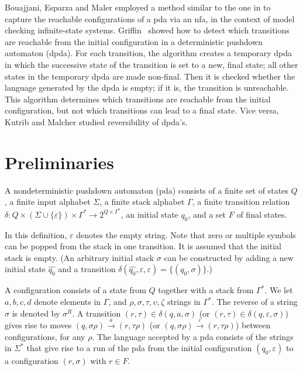 \documentclass{llncs}
\newcommand{\eps}{\ensuremath{\varepsilon}}
\begin{document}
Bouajjani, Esparza and Maler \cite{BouajjaniEM97} employed a method similar to the one in \cite{FinkelWW97}
to capture the reachable configurations of a pda via an nfa, in the context of model checking infinite-state systems.
Griffin~\cite{Griffin06} showed how to detect which transitions are reachable
from the initial configuration in a deterministic pushdown automaton (dpda).
For each transition, the algorithm creates a temporary dpda in which the
successive state of the transition is set to a new, final state; all other
states in the temporary dpda are made non-final. Then it is checked whether the
language generated by the dpda is empty; if it is, the transition is unreachable.
This algorithm determines which transitions are reachable
from the initial configuration, but not which transitions can lead to a final state.
Vice versa, Kutrib and Malcher \cite{KutribMalcher12} studied reversibility of dpda's.




\section{Preliminaries}

\begin{definition}\label{def:NPDA}
A nondeterministic pushdown automaton (pda) consists of
a finite set of states $Q$, a finite input alphabet $\Sigma$, a finite stack alphabet $\Gamma$,
a finite transition relation $\delta:Q \times (\Sigma\cup\{\eps\}) \times \Gamma^* \rightarrow 2^{Q \times \Gamma^*}$,
an initial state $q_0$, and a set $F$ of final states.
\end{definition}

\noindent
In this definition, $\eps$ denotes the empty string. Note that
zero or multiple symbols can be popped from the stack in one transition.
It is assumed that the initial stack is empty. (An arbitrary initial stack $\sigma$ can be constructed
by adding a new initial state $\hat{q_0}$ and a transition $\delta(\hat{q_0},\eps,\eps)=\{(q_0,\sigma)\}$.)

A configuration consists of a state from $Q$ together with a stack from $\Gamma^*$.
We let $a,b,c,d$ denote elements in $\Gamma$, and $\rho,\sigma,\tau,\upsilon,\zeta$ strings in $\Gamma^*$.
The reverse of a string $\sigma$ is denoted by $\sigma^R$.
A transition $(r,\tau)\in\delta(q,a,\sigma)$ (or $(r,\tau)\in\delta(q,\eps,\sigma)$)
gives rise to moves $(q,\sigma\rho)\stackrel{a}{\rightarrow}(r,\tau\rho)$ (or $(q,\sigma\rho)\stackrel{\eps}{\rightarrow}(r,\tau\rho)$)
between configurations, for any $\rho$.
The language accepted by a pda consists of the strings in $\Sigma^*$ that give rise to a run
of the pda from the initial configuration $(q_0,\eps)$ to a configuration $(r,\sigma)$ with $r\in F$.
\end{document}
